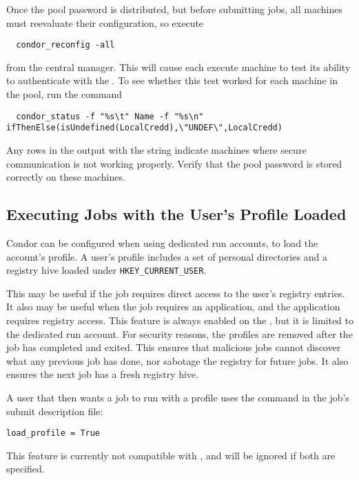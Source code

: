 Once the pool password is distributed, 
but before submitting jobs,
all machines must reevaluate their configuration,
so execute
\begin{verbatim}
  condor_reconfig -all
\end{verbatim}
from the central manager.
This will cause each execute machine to test its ability
to authenticate with the .
To see whether this test worked for each machine in the pool, run the command
\footnotesize
\begin{verbatim}
  condor_status -f "%s\t" Name -f "%s\n" ifThenElse(isUndefined(LocalCredd),\"UNDEF\",LocalCredd)
\end{verbatim}
\normalsize
Any rows in the output with the  string indicate machines where
secure communication is not working properly. Verify that the pool password
is stored correctly on these machines.

\subsection{\label{sec:windows-load-profile}Executing Jobs with the User's Profile Loaded}
Condor can be configured when using dedicated run accounts, 
to load the account's profile.  A user's profile includes a set of personal 
directories and a registry hive loaded under \texttt{HKEY\_CURRENT\_USER}.

This may be useful if the job requires direct access to the user's registry 
entries.
It also may be useful when the job requires an application, 
and the application requires registry access. 
This feature is always enabled on the , 
but it is limited to the dedicated run account.
For security reasons, the profiles are
removed after the job has completed and exited.  
This ensures 
that malicious jobs cannot discover what any previous job has done, nor 
sabotage the registry for future jobs. It also ensures the next job has 
a fresh registry hive.

A user that then wants a job to run with a profile uses the
 command in the job's submit description file:
\begin{verbatim}
load_profile = True
\end{verbatim}

This feature is currently not compatible with , 
and will be ignored if both are specified.

